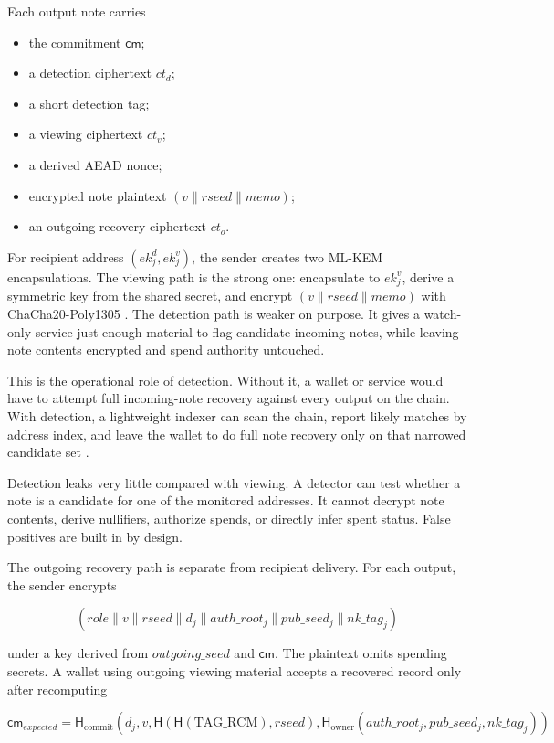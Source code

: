 \documentclass[11pt]{article}
\newcommand{\Hash}{\mathsf{H}}
\newcommand{\cm}{\mathsf{cm}}
\begin{document}
Each output note carries

\begin{itemize}
  \item the commitment \(\cm\);
  \item a detection ciphertext \(ct_d\);
  \item a short detection tag;
  \item a viewing ciphertext \(ct_v\);
  \item a derived AEAD nonce;
  \item encrypted note plaintext \((v \parallel rseed \parallel memo)\);
  \item an outgoing recovery ciphertext \(ct_o\).
\end{itemize}

For recipient address \((ek^d_j, ek^v_j)\), the sender creates two ML-KEM
encapsulations. The viewing path is the strong one: encapsulate to \(ek^v_j\),
derive a symmetric key from the shared secret, and encrypt
\((v \parallel rseed \parallel memo)\) with ChaCha20-Poly1305
\cite{nist-fips203,kyber,chacha-rfc}. The detection path is weaker on purpose.
It gives a watch-only service just enough material to flag candidate incoming
notes, while leaving note contents encrypted and spend authority untouched.

This is the operational role of detection. Without it, a wallet or service would
have to attempt full incoming-note recovery against every output on the chain.
With detection, a lightweight indexer can scan the chain, report likely
matches by address index, and leave the wallet to do full note recovery only on
that narrowed candidate set \cite{fmd}.

Detection leaks very little compared with viewing. A detector can test whether a
note is a candidate for one of the monitored addresses. It cannot decrypt note
contents, derive nullifiers, authorize spends, or directly infer spent status.
False positives are built in by design.

The outgoing recovery path is separate from recipient delivery. For each output,
the sender encrypts

\[
(role \parallel v \parallel rseed \parallel d_j \parallel auth\_root_j
 \parallel pub\_seed_j \parallel nk\_tag_j)
\]

under a key derived from \(outgoing\_seed\) and \(\cm\). The plaintext omits
spending secrets. A wallet using outgoing viewing material accepts a recovered
record only after recomputing

\[
\cm_{expected} =
\Hash_{\mathrm{commit}}(d_j, v, \Hash(\Hash(\mathrm{TAG\_RCM}), rseed),
\Hash_{\mathrm{owner}}(auth\_root_j, pub\_seed_j, nk\_tag_j))
\]
\end{document}
